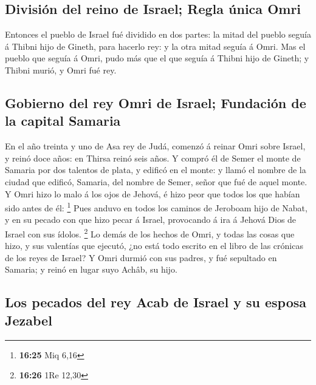\hypertarget{divisiuxf3n-del-reino-de-israel-regla-uxfanica-omri}{%
\subsection{División del reino de Israel; Regla única
Omri}\label{divisiuxf3n-del-reino-de-israel-regla-uxfanica-omri}}

 Entonces el pueblo de Israel fué dividido en dos partes:
la mitad del pueblo seguía á Thibni hijo de Gineth, para hacerlo rey: y
la otra mitad seguía á Omri.  Mas el pueblo que seguía á
Omri, pudo más que el que seguía á Thibni hijo de Gineth; y Thibni
murió, y Omri fué rey.

\hypertarget{gobierno-del-rey-omri-de-israel-fundaciuxf3n-de-la-capital-samaria}{%
\subsection{Gobierno del rey Omri de Israel; Fundación de la capital
Samaria}\label{gobierno-del-rey-omri-de-israel-fundaciuxf3n-de-la-capital-samaria}}

 En el año treinta y uno de Asa rey de Judá, comenzó á
reinar Omri sobre Israel, y reinó doce años: en Thirsa reinó seis años.
 Y compró él de Semer el monte de Samaria por dos
talentos de plata, y edificó en el monte: y llamó el nombre de la ciudad
que edificó, Samaria, del nombre de Semer, señor que fué de aquel monte.
 Y Omri hizo lo malo á los ojos de Jehová, é hizo peor
que todos los que habían sido antes de él: \footnote{\textbf{16:25} Miq
  6,16}  Pues anduvo en todos los caminos de Jeroboam
hijo de Nabat, y en su pecado con que hizo pecar á Israel, provocando á
ira á Jehová Dios de Israel con sus ídolos. \footnote{\textbf{16:26} 1Re
  12,30}  Lo demás de los hechos de Omri, y todas las
cosas que hizo, y sus valentías que ejecutó, ¿no está todo escrito en el
libro de las crónicas de los reyes de Israel?  Y Omri
durmió con sus padres, y fué sepultado en Samaria; y reinó en lugar suyo
Achâb, su hijo.

\hypertarget{los-pecados-del-rey-acab-de-israel-y-su-esposa-jezabel}{%
\subsection{Los pecados del rey Acab de Israel y su esposa
Jezabel}\label{los-pecados-del-rey-acab-de-israel-y-su-esposa-jezabel}}

